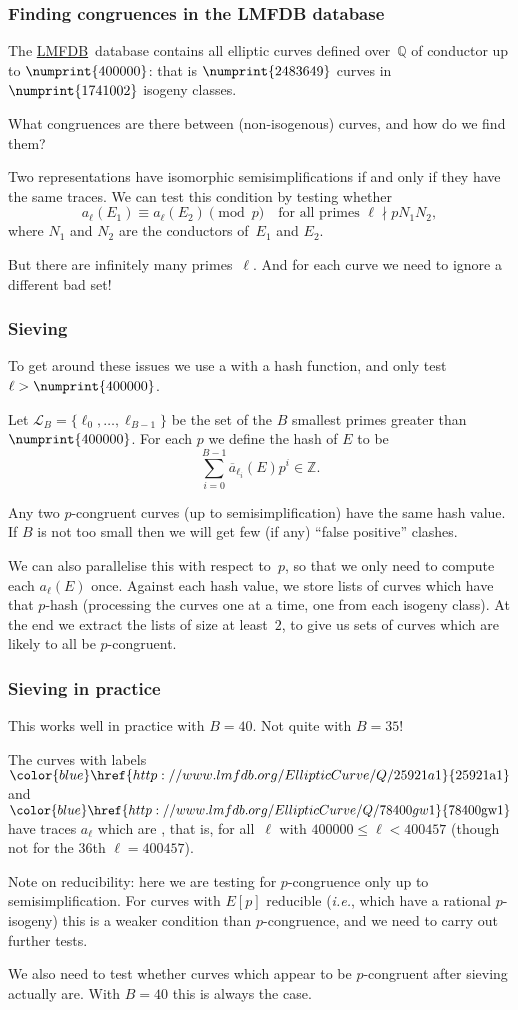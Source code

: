 \documentclass[handout]{beamer}
\newcommand{\Q}{\mathbb Q}
\newcommand{\Z}{\mathbb Z}
\newcommand{\LL}{\mathcal L}
\newcommand{\lmfdbec}[3]{\color{blue}\href{http://www.lmfdb.org/EllipticCurve/Q/#1#2#3}{{\text{\rm#1#2#3}}}}
\newcommand{\LMFDB}{\href{http://www.lmfdb.org/EllipticCurve/Q}{\color{blue}LMFDB}}
\newcommand{\high}[1]{\emph{\color{blue}{#1}}}
\begin{document}
\begin{frame}\frametitle{Finding congruences in the LMFDB database}
The \LMFDB\ database contains all elliptic curves defined over~$\Q$ of
conductor up to $\numprint{400000}$: that is $\numprint{2483649}$
curves in $\numprint{1741002}$ isogeny classes.

What congruences are there between (non-isogenous) curves, and how do
we find them?

Two representations have isomorphic semisimplifications if and only if
they have the same traces. We can test this condition by testing
whether
\[ a_{\ell}(E_1)\equiv a_{\ell}(E_2)\pmod{p}
\quad \text{for all primes } \ell \nmid pN_1N_2,
\] 
where $N_1$ and $N_2$ are the conductors of~$E_1$ and $E_2$.

But there are infinitely many primes~$\ell$.  And for each curve we need to
ignore a different bad set!
\end{frame}

\begin{frame}\frametitle{Sieving}
  To get around these issues we use a \high{sieve} with a hash
  function, and only test $\ell>\numprint{400000}$.

  Let $\LL_B=\{\ell_0,\dots,\ell_{B-1}\}$ be the set of the $B$
  smallest primes greater than $\numprint{400000}$.  For each $p$ we
  define the hash of $E$ to be
  \[\sum_{i=0}^{B-1}\overline{a}_{\ell_i}(E)p^i\in\Z.\]

 Any two $p$-congruent curves (up to semisimplification) have the same
 hash value.  If $B$ is not too small then we will get few (if any)
 ``false positive'' clashes.

  We can also parallelise this with respect to~$p$, so that we only
  need to compute each $a_{\ell}(E)$ once.  Against each hash value,
  we store lists of curves which have that $p$-hash (processing the
  curves one at a time, one from each isogeny class).  At the end we
  extract the lists of size at least~$2$, to give us sets of curves
  which are likely to all be $p$-congruent. %

\end{frame}

\begin{frame}\frametitle{Sieving in practice}
  This works well in practice with $B=40$. Not quite with $B=35$!

  \pause
  \medskip
  The curves with labels $\lmfdbec{25921}{a}{1}$ and
  $\lmfdbec{78400}{gw}{1}$ have traces $a_{\ell}$ which are \high{equal
    for all~$\ell\in\LL_{35}$}, that is, for all~$\ell$ with
  $400000\le \ell<400457$ (though not for the 36th $\ell=400457$).
  \pause
  \medskip

  Note on reducibility: here we are testing for $p$-congruence only up
  to semisimplification.  For curves with $E[p]$ reducible
  (\textit{i.e.}, which have a rational $p$-isogeny) this is a weaker
  condition than $p$-congruence, and we need to carry out further
  tests.

    \pause
  \medskip
  We also need to test whether curves which appear to be $p$-congruent
  after sieving actually are.  With $B=40$ this is always the case.
\end{frame}
\end{document}
